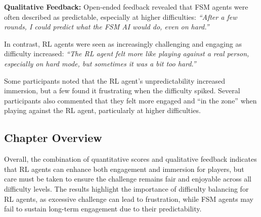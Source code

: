\documentclass[conference]{IEEEtran}
\begin{document}
\textbf{Qualitative Feedback:}  
Open-ended feedback revealed that FSM agents were often described as predictable, especially at higher difficulties:  
\textit{“After a few rounds, I could predict what the FSM AI would do, even on hard.”}

In contrast, RL agents were seen as increasingly challenging and engaging as difficulty increased:  
\textit{“The RL agent felt more like playing against a real person, especially on hard mode, but sometimes it was a bit too hard.”}

Some participants noted that the RL agent's unpredictability increased immersion, but a few found it frustrating when the difficulty spiked.
Several participants also commented that they felt more engaged and “in the zone” when playing against the RL agent, particularly at higher difficulties.

\subsection{Chapter Overview}
Overall, the combination of quantitative scores and qualitative feedback indicates that RL agents can enhance both engagement and immersion for players,
but care must be taken to ensure the challenge remains fair and enjoyable across all difficulty levels.
The results highlight the importance of difficulty balancing for RL agents, as excessive challenge can lead to frustration,
while FSM agents may fail to sustain long-term engagement due to their predictability.


\end{document}
